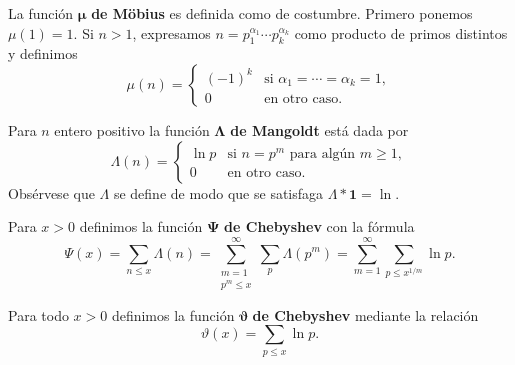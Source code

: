 La funci\'on \(\boldsymbol{\mu}\) \textbf{de M\"{o}bius} es definida como de costumbre. 
Primero ponemos \(\mu(1) = 1\).
Si \(n > 1\), expresamos \(n = p_1^{\alpha_1} \cdots p_k^{\alpha_k}\)
como producto de primos distintos y definimos
\[
  \mu(n) = 
  \begin{cases}
    (-1)^k &\text{si } \alpha_1 = \cdots = \alpha_k = 1, \\
    0 &\text{en otro caso}. 
  \end{cases}
\]

Para \(n\) entero positivo la funci\'on
\(\boldsymbol{\Lambda}\) \textbf{de Mangoldt} est\'a dada por 
\[
  \Lambda(n) =
  \begin{cases}
    \ln p &\text{si } n = p^m \text{ para alg\'un } m \geq 1,\\
    0 &\text{en otro caso.}
  \end{cases}
\]
Obs\'ervese que \(\Lambda\) se define de modo que se satisfaga
\(\Lambda * \textbf{1} = \ln\).

Para \(x > 0\) definimos la funci\'on
\(\boldsymbol{\Psi}\) \textbf{de Chebyshev} con la f\'ormula
\[
  \Psi(x)
  = \sum_{n \leq x} \Lambda(n) 
  = \sum_{\substack{m = 1\\p^m \leq x}}^\infty \sum_p \Lambda(p^m)
  = \sum_{m = 1}^\infty \sum_{p \leq x^{1/m}} \ln p.
\]

Para todo \(x > 0\) definimos la funci\'on \(\boldsymbol{\vartheta}\)
\textbf{de Chebyshev} mediante la relaci\'on
\[
  \vartheta(x) = \sum_{p \leq x} \ln p.
\]
